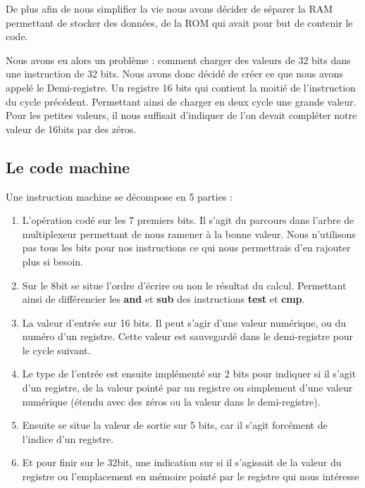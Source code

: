 \documentclass[10pt,a4paper,notitlepage ]{article}
\begin{document}
		De plus afin de nous simplifier la vie nous avons décider de séparer la RAM permettant de stocker des données, de la ROM qui avait pour but de contenir le code.

		Nous avons eu alors un problème : comment charger des valeurs de 32 bits dans une instruction de 32 bits. Nous avons donc décidé de créer ce que nous avons appelé le Demi-registre. Un registre 16 bits qui contient la moitié de l'instruction du cycle précédent. Permettant ainsi de charger en deux cycle une grande valeur. Pour les petites valeurs, il nous suffisait d'indiquer de l'on devait compléter notre valeur de 16bits par des zéros.

		\subsection{Le code machine}

		Une instruction machine se décompose en 5 parties : 
		\begin{enumerate}
			\item L'opération codé sur les 7 premiers bits. Il s'agit du parcours dans l'arbre de multiplexeur permettant de nous ramener à la bonne valeur. Nous n'utilisons pas tous les bits pour nos instructions ce qui nous permettrais d'en rajouter plus si besoin.

			\item Sur le 8\ieme bit se situe l'ordre d'écrire ou non le résultat du calcul. Permettant ainsi de différencier les \textbf{and} et \textbf{sub} des instructions \textbf{test} et \textbf{cmp}.

			\item La valeur d'entrée sur 16 bits. Il peut s'agir d'une valeur numérique, ou du numéro d'un registre. Cette valeur est sauvegardé dans le demi-registre pour le cycle suivant.

			\item Le type de l'entrée est ensuite implémenté sur 2 bits pour indiquer si il s'agit d'un registre, de la valeur pointé par un registre ou simplement d'une valeur numérique (étendu avec des zéros ou la valeur dans le demi-registre).

			\item Ensuite se situe la valeur de sortie sur 5 bits, car il s'agit forcément de l'indice d'un registre.

			\item Et pour finir sur le 32\ieme bit, une indication sur si il s'agissait de la valeur du registre ou l'emplacement en mémoire pointé par le registre qui nous intéresse
		\end{enumerate}
\end{document}
